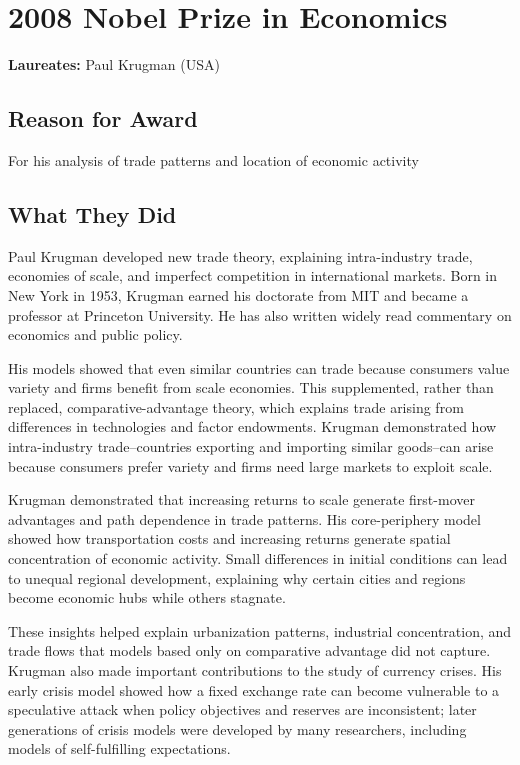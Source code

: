 \chapter{2008 Nobel Prize in Economics}
\textbf{Laureates: }Paul Krugman (USA)

\section*{Reason for Award}
For his analysis of trade patterns and location of economic activity

\section{What They Did}
Paul Krugman developed new trade theory, explaining intra-industry trade,
economies of scale, and imperfect competition in international markets. Born
in New York in 1953, Krugman earned his doctorate from MIT and became a
professor at Princeton University. He has also written widely read commentary
on economics and public policy.

His models showed that even similar countries can trade because consumers value
variety and firms benefit from scale economies. This supplemented, rather than
replaced, comparative-advantage theory, which explains trade arising from
differences in technologies and factor endowments. Krugman demonstrated how
intra-industry trade--countries exporting and importing similar goods--can arise
because consumers prefer variety and firms need large markets to exploit scale.

Krugman demonstrated that increasing returns to scale generate first-mover
advantages and path dependence in trade patterns. His core-periphery model
showed how transportation costs and increasing returns generate spatial
concentration of economic activity. Small differences in initial conditions
can lead to unequal regional development, explaining why certain cities and
regions become economic hubs while others stagnate.

These insights helped explain urbanization patterns, industrial concentration,
and trade flows that models based only on comparative advantage did not capture.
Krugman also made important contributions to the study of currency crises. His
early crisis model showed how a fixed exchange rate can become vulnerable to a
speculative attack when policy objectives and reserves are inconsistent; later
generations of crisis models were developed by many researchers, including models
of self-fulfilling expectations.

